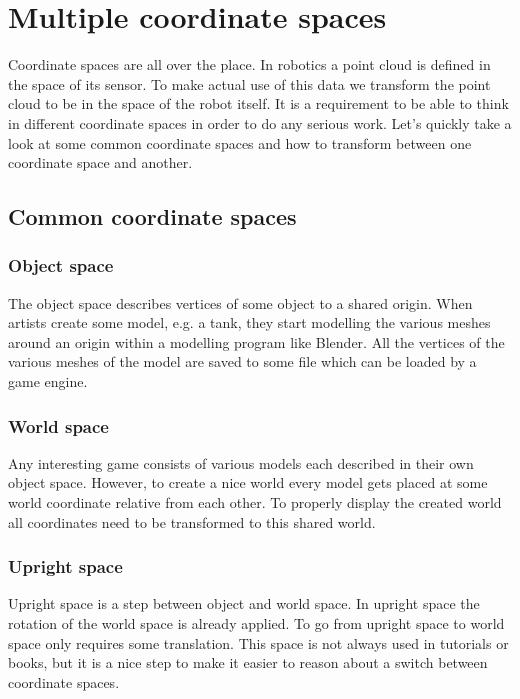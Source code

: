 \section{Multiple coordinate spaces}

Coordinate spaces are all over the place. In robotics a point cloud is defined in the space of its sensor. To make actual use of this data we transform the point cloud to be in the space of the robot itself. It is a requirement to be able to think in different coordinate spaces in order to do any serious work. Let's quickly take a look at some common coordinate spaces and how to transform between one coordinate space and another.

\subsection{Common coordinate spaces}

\subsubsection{Object space}

The object space describes vertices of some object to a shared origin. When artists create some model, e.g. a tank, they start modelling the various meshes around an origin within a modelling program like Blender. All the vertices of the various meshes of the model are saved to some file which can be loaded by a game engine.

\subsubsection{World space}

Any interesting game consists of various models each described in their own object space. However, to create a nice world every model gets placed at some world coordinate relative from each other. To properly display the created world all coordinates need to be transformed to this shared world.

\subsubsection{Upright space}

Upright space is a step between object and world space. In upright space the rotation of the world space is already applied. To go from upright space to world space only requires some translation. This space is not always used in tutorials or books, but it is a nice step to make it easier to reason about a switch between coordinate spaces.

